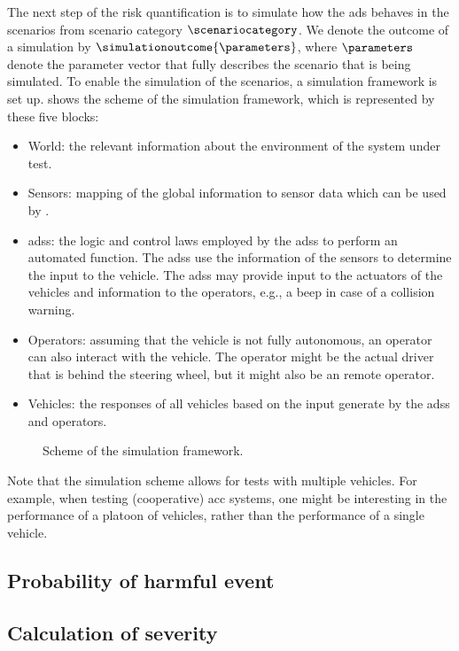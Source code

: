 The next step of the risk quantification is to simulate how the \ac{ads} behaves in the scenarios from scenario category $\scenariocategory$. 
We denote the outcome of a simulation by $\simulationoutcome{\parameters}$, where $\parameters$ denote the parameter vector that fully describes the scenario that is being simulated.
To enable the simulation of the scenarios, a simulation framework is set up.
 shows the scheme of the simulation framework, which is represented by these five blocks:
\begin{itemize}
	\item World: the relevant information about the environment of the system under test.
	\item Sensors: mapping of the global information to sensor data which can be used by . 
	\item \acp{ads}: the logic and control laws employed by the \acp{ads} to perform an automated function.
	The \acp{ads} use the information of the sensors to determine the input to the vehicle.
	The \acp{ads} may provide input to the actuators of the vehicles and information to the operators, e.g., a beep in case of a collision warning.
	\item Operators: assuming that the vehicle is not fully autonomous, an operator can also interact with the vehicle.
	The operator might be the actual driver that is behind the steering wheel, but it might also be an remote operator.
	\item Vehicles: the responses of all vehicles based on the input generate by the \acp{ads} and operators.
\end{itemize}

\begin{figure}
	\centering
	
	\caption{Scheme of the simulation framework.}
	\label{fig:simulation scheme}
\end{figure}

Note that the simulation scheme allows for tests with multiple vehicles.
For example, when testing (cooperative) \ac{acc} systems, one might be interesting in the performance of a platoon of vehicles, rather than the performance of a single vehicle.



\subsection{Probability of harmful event}
\label{sec:harmful}



\subsection{Calculation of severity}
\label{sec:severity}
